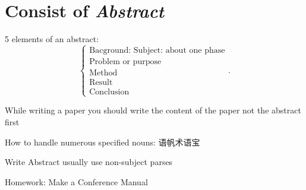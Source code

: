 \section{Consist of \textit{Abstract}}%
\label{sec:Consist of Abstract}
5 elements of an abstract:
\[
    \begin{cases}
        \text{Bacground: Subject: about one phase}\\
        \text{Problem or purpose}\\
        \text{Method}\\
        \text{Result}\\
        \text{Conclusion}
    \end{cases}
.\] 
\begin{notation}
    While writing a paper you should write the content of the paper not the abstract first
\end{notation}
\begin{notation}
    How to handle numerous specified nouns: 语帆术语宝

    Write Abstract usually use non-subject parses
\end{notation}
Homework: Make a Conference Manual

